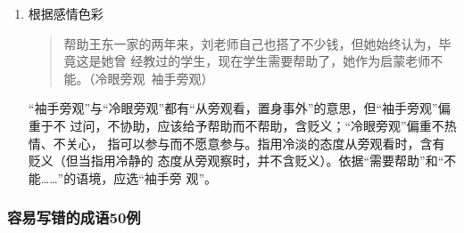 \documentclass[final,oneside]{ctexbook}
\newenvironment{equotation}{\begin{quotation}\kaishu}{\end{quotation}}
\begin{document}
\begin{enumerate}
  \item 根据感情色彩
    \begin{equotation}
      帮助王东一家的两年来，刘老师自己也搭了不少钱，但她始终认为，毕竟这是她曾
      经教过的学生，现在学生需要帮助了，她作为启蒙老师不能。（冷眼旁观~袖手旁观）
    \end{equotation}
    “袖手旁观”与“冷眼旁观”都有“从旁观看，置身事外”的意思，但“袖手旁观”偏重于不
    过问，不协助，应该给予帮助而不帮助，含贬义；“冷眼旁观”偏重不热情、不关心，
    指可以参与而不愿意参与。指用冷淡的态度从旁观看时，含有贬义（但当指用冷静的
    态度从旁观察时，并不含贬义）。依据“需要帮助”和“不能……”的语境，应选“袖手旁
    观”。

\end{enumerate}

\subsubsection{容易写错的成语50例}
\end{document}
